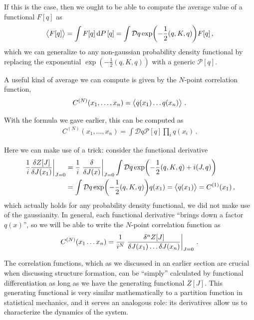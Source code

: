 \documentclass[main.tex]{subfiles}
\begin{document}
If this is the case, then we ought to be able to compute the average value of a functional \(F[q]\) as 
%
\begin{align} \label{eq:average-of-a-functional}
\expval{F[q]} = \int F[q] \dd{P}[q] = \int \mathcal{D}q \exp(- \frac{1}{2} (q, K, q)) F[q]  
\,,
\end{align}
%
which we can generalize to any non-gaussian probability density functional by replacing the exponential \(\exp(- \frac{1}{2} (q, K, q))\) with a generic \(\mathcal{P}[q]\).

A useful kind of average we can compute is given by the \(N\)-point correlation function, 
%
\begin{align}
C^{(N)}(x_1, \dots, x_n) = \expval{q(x_1) \dots q(x_n)}
\,.
\end{align}

With the formula we gave earlier, this can be computed as 
%
\begin{align}
C^{(N)}(x_1, \dots , x_n)
= \int \mathcal{D}q \mathcal{P}[q] \prod_i q(x_i)
\,.
\end{align}

Here we can make use of a trick: consider the functional derivative
%
\begin{align}
\eval{\frac{1}{i}\fdv{Z[J]}{J(x_1 )}}_{J = 0} &= \frac{1}{i} \eval{\fdv{}{J(x)}}_{J=0} \int \mathcal{D}q
\exp(- \frac{1}{2} (q, K, q) + i (J,q))  \\
&= \int \mathcal{D}q \exp(- \frac{1}{2} (q, K, q)) q(x_1 )
= \expval{q(x_1 )} = C^{(1)}(x_1 )
\,,
\end{align}
%
which actually holds for any probability density functional, we did not make use of the gaussianity.
In general, each functional derivative ``brings down a factor \(q(x)\)'', so we will be able to write the \(N\)-point correlation function as
%
\begin{align}
C^{(N)} (x_1 \dots x_n) = \frac{1}{i^{N}} \eval{\frac{ \delta^{n} Z[J]}{ \delta J(x_1 )\dots \delta J(x_n)}}_{J =0 }
\,.
\end{align}

The correlation functions, which as we discussed in an earlier section are crucial when discussing structure formation, can be ``simply'' calculated by functional differentiation as long as we have the generating functional \(Z[J]\).
This generating functional is very similar mathematically to a partition function in statistical mechanics, and it serves an analogous role: its derivatives allow us to characterize the dynamics of the system. 
\end{document}
